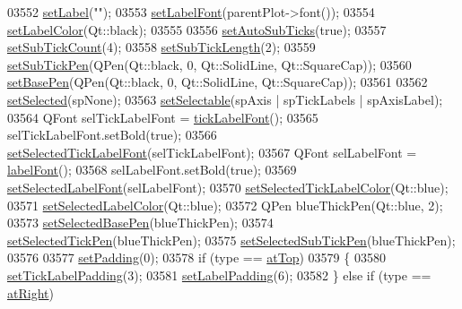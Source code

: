 \begin{DoxyCode}
03552   \hyperlink{a00025_a33bcc382c111c9f31bb0687352a2dea4}{setLabel}(\textcolor{stringliteral}{""});
03553   \hyperlink{a00025_a71ac1a47f7547e490a8c4311d1433cf3}{setLabelFont}(parentPlot->font());
03554   \hyperlink{a00025_a6c906fe56d75f0122335b9f79b999608}{setLabelColor}(Qt::black);
03555   
03556   \hyperlink{a00025_adcbdec7a60054b88571e89599f4a45bf}{setAutoSubTicks}(\textcolor{keyword}{true});
03557   \hyperlink{a00025_a4b1554ead9d7f9799650d51383e326dd}{setSubTickCount}(4);
03558   \hyperlink{a00025_ab702d6fd42fc620607435339a1c2a2e1}{setSubTickLength}(2);
03559   \hyperlink{a00025_aede4028ae7516bd51a60618a8233f9cf}{setSubTickPen}(QPen(Qt::black, 0, Qt::SolidLine, Qt::SquareCap));
03560   \hyperlink{a00025_a778d45fb71b3c7ab3bb7079e18b058e4}{setBasePen}(QPen(Qt::black, 0, Qt::SolidLine, Qt::SquareCap));
03561   
03562   \hyperlink{a00025_a24c13908da2f8d629b1bbbe9cbd63e39}{setSelected}(spNone);
03563   \hyperlink{a00025_afa988209bf6519f63d6ef2e615dbe1ea}{setSelectable}(spAxis | spTickLabels | spAxisLabel);
03564   QFont selTickLabelFont = \hyperlink{a00025_af6d7ad17f3398b114a413f7a3dc5ef9d}{tickLabelFont}();
03565   selTickLabelFont.setBold(\textcolor{keyword}{true});
03566   \hyperlink{a00025_a845ccb560b7bc5281098a5be494145f6}{setSelectedTickLabelFont}(selTickLabelFont);
03567   QFont selLabelFont = \hyperlink{a00025_ae8029ae0b32e9d4d73dddcdd0a08c838}{labelFont}();
03568   selLabelFont.setBold(\textcolor{keyword}{true});
03569   \hyperlink{a00025_a02ec2a75d4d8401eaab834fbc6803d30}{setSelectedLabelFont}(selLabelFont);
03570   \hyperlink{a00025_a9bdbf5e63ab15187f3a1de9440129227}{setSelectedTickLabelColor}(Qt::blue);
03571   \hyperlink{a00025_a5d502dec597c634f491fdd73d151c72d}{setSelectedLabelColor}(Qt::blue);
03572   QPen blueThickPen(Qt::blue, 2);
03573   \hyperlink{a00025_aeb917a909215605b95ef2be843de1ee8}{setSelectedBasePen}(blueThickPen);
03574   \hyperlink{a00025_a8360502685eb782edbf04019c9345cdc}{setSelectedTickPen}(blueThickPen);
03575   \hyperlink{a00025_a2a00a7166600155eac26843132eb9576}{setSelectedSubTickPen}(blueThickPen);
03576   
03577   \hyperlink{a00025_a5691441cb3de9e9844855d339c0db279}{setPadding}(0);
03578   \textcolor{keywordflow}{if} (type == \hyperlink{a00025_ae2bcc1728b382f10f064612b368bc18aac0ece2b680d3f545e701f75af1655977}{atTop})
03579   \{
03580     \hyperlink{a00025_af302c479af9dbc2e9f0e44e07c0012ee}{setTickLabelPadding}(3);
03581     \hyperlink{a00025_a4391192a766e5d20cfe5cbc17607a7a2}{setLabelPadding}(6);
03582   \} \textcolor{keywordflow}{else} \textcolor{keywordflow}{if} (type == \hyperlink{a00025_ae2bcc1728b382f10f064612b368bc18aadf5509f7d29199ef2f263b1dd224b345}{atRight})

\end{DoxyCode}
